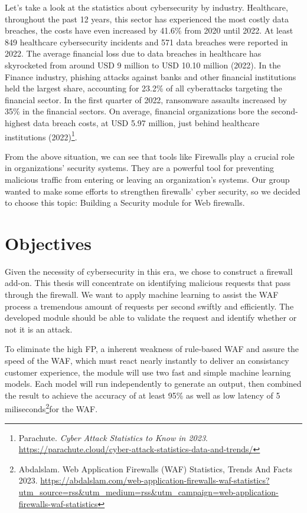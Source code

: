 Let's take a look at the statistics about cybersecurity by industry. Healthcare, throughout the past 12 years, this sector has experienced the most costly data breaches, the costs have even increased by 41.6\% from 2020 until 2022. At least 849 healthcare cybersecurity incidents and 571 data breaches were reported in 2022. The average financial loss due to data breaches in healthcare has skyrocketed from around USD 9 million to USD 10.10 million (2022). In the Finance industry, phishing attacks against banks and other financial institutions held the largest share, accounting for 23.2\% of all cyberattacks targeting the financial sector. In the first quarter of 2022, ransomware assaults increased by 35\% in the financial sectors. On average, financial organizations bore the second-highest data breach costs, at USD 5.97 million, just behind healthcare institutions (2022)\footnote{Parachute. \textit{Cyber Attack Statistics to Know in 2023}. \url{https://parachute.cloud/cyber-attack-statistics-data-and-trends/}}. 

From the above situation, we can see that tools like Firewalls play a crucial role in organizations' security systems. They are a powerful tool for preventing malicious traffic from entering or leaving an organization’s systems. Our group wanted to make some efforts to strengthen firewalls' cyber security, so we decided to choose this topic: Building a Security module for Web firewalls.
\section{Objectives}
\label{sec:objectives}
Given the necessity of cybersecurity in this era, we chose to construct a firewall add-on. This thesis will concentrate on identifying malicious requests that pass through the firewall. We want to apply machine learning to assist the WAF process a tremendous amount of requests per second swiftly and efficiently. The developed module should be able to validate the request and identify whether or not it is an attack.

To eliminate the high FP, a inherent weakness of rule-based WAF and assure the speed of the WAF, which must react nearly instantly to deliver an consistancy customer experience, the module will use two fast and simple machine learning models. Each model will run independently to generate an output, then combined the result to achieve the accuracy of at least 95\% as well as low latency of 5 miliseconds\footnote{Abdalslam. Web Application Firewalls (WAF) Statistics, Trends And Facts 2023. \url{https://abdalslam.com/web-application-firewalls-waf-statistics?utm_source=rss&utm_medium=rss&utm_campaign=web-application-firewalls-waf-statistics}}for the WAF.

